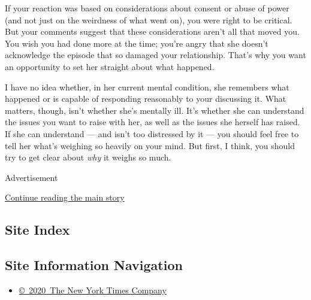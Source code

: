 If your reaction was based on considerations about consent or abuse of
power (and not just on the weirdness of what went on), you were right to
be critical. But your comments suggest that these considerations aren't
all that moved you. You wish you had done more at the time; you're angry
that she doesn't acknowledge the episode that so damaged your
relationship. That's why you want an opportunity to set her straight
about what happened.

I have no idea whether, in her current mental condition, she remembers
what happened or is capable of responding reasonably to your discussing
it. What matters, though, isn't whether she's mentally ill. It's whether
she can understand the issues you want to raise with her, as well as the
issues she herself has raised. If she can understand --- and isn't too
distressed by it --- you should feel free to tell her what's weighing so
heavily on your mind. But first, I think, you should try to get clear
about \emph{why} it weighs so much.

Advertisement

\protect\hyperlink{after-bottom}{Continue reading the main story}

\hypertarget{site-index}{%
\subsection{Site Index}\label{site-index}}

\hypertarget{site-information-navigation}{%
\subsection{Site Information
Navigation}\label{site-information-navigation}}

\begin{itemize}
\tightlist
\item
  \href{https://help.nytimes3xbfgragh.onion/hc/en-us/articles/115014792127-Copyright-notice}{©~2020~The
  New York Times Company}
\end{itemize}

